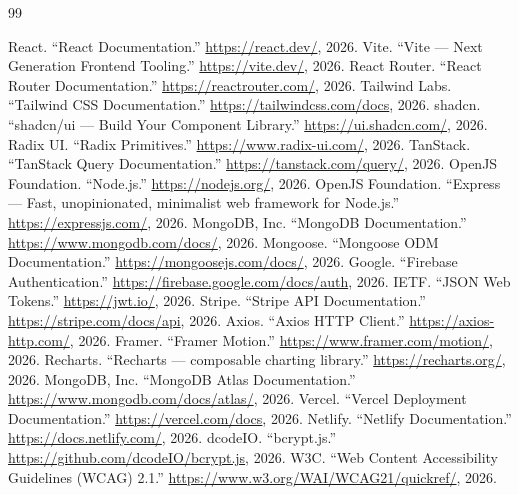 \documentclass[12pt,a4paper]{report}
\begin{document}
\begin{thebibliography}{99}

      React. ``React Documentation.'' \url{https://react.dev/}, 2026.
       Vite. ``Vite --- Next Generation Frontend Tooling.'' \url{https://vite.dev/}, 2026.
     React Router. ``React Router Documentation.'' \url{https://reactrouter.com/}, 2026.
   Tailwind Labs. ``Tailwind CSS Documentation.'' \url{https://tailwindcss.com/docs}, 2026.
     shadcn. ``shadcn/ui --- Build Your Component Library.'' \url{https://ui.shadcn.com/}, 2026.
      Radix UI. ``Radix Primitives.'' \url{https://www.radix-ui.com/}, 2026.
      TanStack. ``TanStack Query Documentation.'' \url{https://tanstack.com/query/}, 2026.
       OpenJS Foundation. ``Node.js.'' \url{https://nodejs.org/}, 2026.
    OpenJS Foundation. ``Express --- Fast, unopinionated, minimalist web framework for Node.js.'' \url{https://expressjs.com/}, 2026.
      MongoDB, Inc. ``MongoDB Documentation.'' \url{https://www.mongodb.com/docs/}, 2026.
   Mongoose. ``Mongoose ODM Documentation.'' \url{https://mongoosejs.com/docs/}, 2026.
   Google. ``Firebase Authentication.'' \url{https://firebase.google.com/docs/auth}, 2026.
        IETF. ``JSON Web Tokens.'' \url{https://jwt.io/}, 2026.
     Stripe. ``Stripe API Documentation.'' \url{https://stripe.com/docs/api}, 2026.
      Axios. ``Axios HTTP Client.'' \url{https://axios-http.com/}, 2026.
     Framer. ``Framer Motion.'' \url{https://www.framer.com/motion/}, 2026.
   Recharts. ``Recharts --- composable charting library.'' \url{https://recharts.org/}, 2026.
      MongoDB, Inc. ``MongoDB Atlas Documentation.'' \url{https://www.mongodb.com/docs/atlas/}, 2026.
     Vercel. ``Vercel Deployment Documentation.'' \url{https://vercel.com/docs}, 2026.
    Netlify. ``Netlify Documentation.'' \url{https://docs.netlify.com/}, 2026.
     dcodeIO. ``bcrypt.js.'' \url{https://github.com/dcodeIO/bcrypt.js}, 2026.
       W3C. ``Web Content Accessibility Guidelines (WCAG) 2.1.'' \url{https://www.w3.org/WAI/WCAG21/quickref/}, 2026.

\end{thebibliography}
\end{document}
